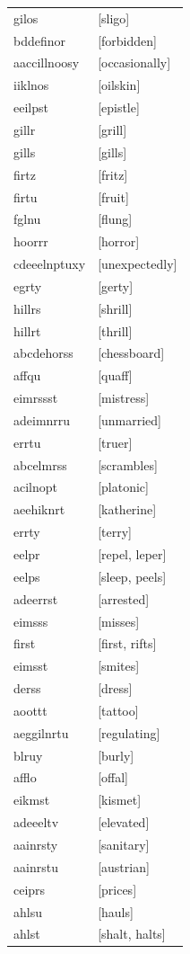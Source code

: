 \documentclass{article}
\begin{document}
\begin{tabular}{ll}
gilos & [sligo] \\
bddefinor & [forbidden] \\
aaccillnoosy & [occasionally] \\
iiklnos & [oilskin] \\
eeilpst & [epistle] \\
gillr & [grill] \\
gills & [gills] \\
firtz & [fritz] \\
firtu & [fruit] \\
fglnu & [flung] \\
hoorrr & [horror] \\
cdeeelnptuxy & [unexpectedly] \\
egrty & [gerty] \\
hillrs & [shrill] \\
hillrt & [thrill] \\
abcdehorss & [chessboard] \\
affqu & [quaff] \\
eimrssst & [mistress] \\
adeimnrru & [unmarried] \\
errtu & [truer] \\
abcelmrss & [scrambles] \\
acilnopt & [platonic] \\
aeehiknrt & [katherine] \\
errty & [terry] \\
eelpr & [repel, leper] \\
eelps & [sleep, peels] \\
adeerrst & [arrested] \\
eimsss & [misses] \\
first & [first, rifts] \\
eimsst & [smites] \\
derss & [dress] \\
aoottt & [tattoo] \\
aeggilnrtu & [regulating] \\
blruy & [burly] \\
afflo & [offal] \\
eikmst & [kismet] \\
adeeeltv & [elevated] \\
aainrsty & [sanitary] \\
aainrstu & [austrian] \\
ceiprs & [prices] \\
ahlsu & [hauls] \\
ahlst & [shalt, halts] \\

\end{tabular}
\end{document}
